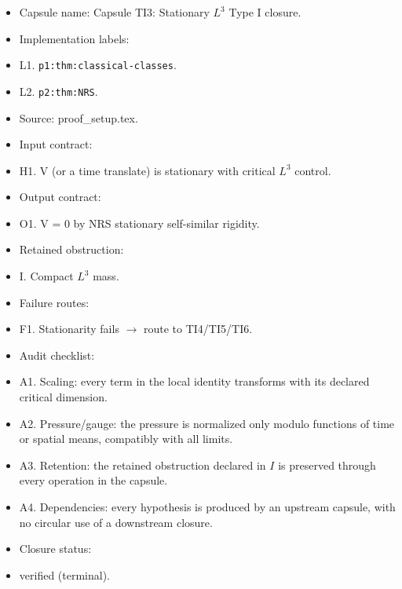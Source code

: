 \documentclass[11pt]{amsart}
\begin{document}
\begin{itemize}
  \item Capsule name: Capsule TI3: Stationary $L^3$ Type I closure.
  \item Implementation labels:
  \item L1. \texttt{p1:thm:classical-classes}.
  \item L2. \texttt{p2:thm:NRS}.
  \item Source: proof\_setup.tex.
  \item Input contract:
  \item H1. V (or a time translate) is stationary with critical $L^3$ control.
  \item Output contract:
  \item O1. V = 0 by NRS stationary self-similar rigidity.
  \item Retained obstruction:
  \item I. Compact $L^3$ mass.
  \item Failure routes:
  \item F1. Stationarity fails $\to$ route to TI4/TI5/TI6.
  \item Audit checklist:
  \item A1. Scaling: every term in the local identity transforms with its declared critical dimension.
  \item A2. Pressure/gauge: the pressure is normalized only modulo functions of time or spatial means, compatibly with all limits.
  \item A3. Retention: the retained obstruction declared in $I$ is preserved through every operation in the capsule.
  \item A4. Dependencies: every hypothesis is produced by an upstream capsule, with no circular use of a downstream closure.
  \item Closure status:
  \item verified (terminal).
\end{itemize}
\end{document}
